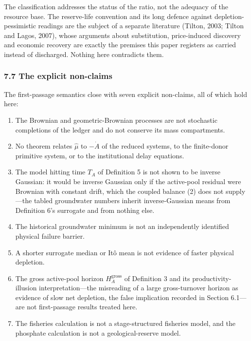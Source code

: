\documentclass[11pt]{article}
\providecommand{\tightlist}{\setlength{\itemsep}{0pt}\setlength{\parskip}{0pt}}
\begin{document}
The classification addresses the status of the ratio, not the adequacy of the resource base. The reserve-life convention and its long defence against depletion-pessimistic readings are the subject of a separate literature (Tilton, 2003; Tilton and Lagos, 2007), whose arguments about substitution, price-induced discovery and economic recovery are exactly the premises this paper registers as carried instead of discharged. Nothing here contradicts them.


\subsubsection{7.7 The explicit
non-claims}\label{the-explicit-non-claims}

The first-passage semantics close with seven explicit non-claims, all of which hold here:

\begin{enumerate}
\def\labelenumi{\arabic{enumi}.}
\tightlist
\item
  The Brownian and geometric-Brownian processes are not stochastic
  completions of the ledger and do not conserve its mass compartments.
\item
  No theorem relates \(\widehat\mu\) to \(-\dot A\) of the reduced
  systems, to the finite-donor primitive system, or to the institutional
  delay equations.
\item
  The model hitting time \(T_A\) of Definition 5 is not shown to be
  inverse Gaussian: it would be inverse Gaussian only if the active-pool
  residual were Brownian with constant drift, which the coupled balance
  (2) does not supply---the tabled groundwater numbers inherit
  inverse-Gaussian means from Definition 6's surrogate and from nothing
  else.
\item
  The historical groundwater minimum is not an independently identified
  physical failure barrier.
\item
  A shorter surrogate median or It\^o mean is not evidence of faster
  physical depletion.
\item
  The gross active-pool horizon \(H_A^{\mathrm{gross}}\) of Definition 3
  and its productivity-illusion interpretation---the misreading of a
  large gross-turnover horizon as evidence of slow net depletion, the
  false implication recorded in Section 6.1---are not first-passage
  results treated here.
\item
  The fisheries calculation is not a stage-structured fisheries model,
  and the phosphate calculation is not a geological-reserve model.
\end{enumerate}
\end{document}
